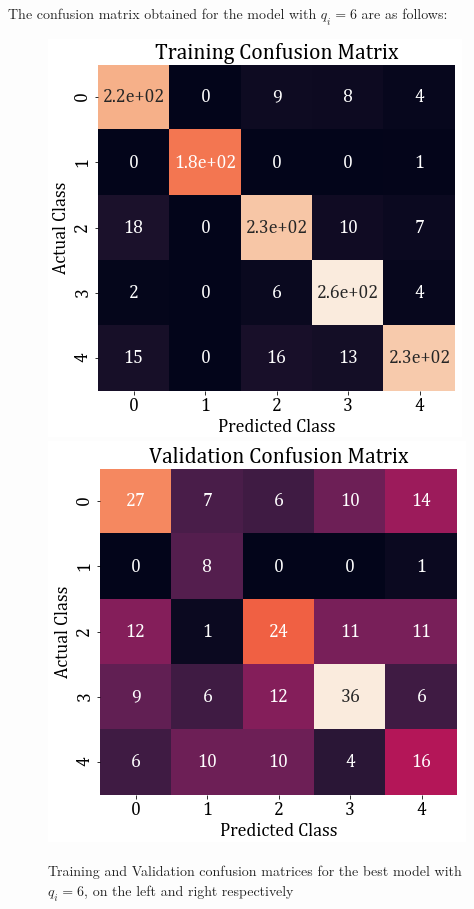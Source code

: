 \documentclass[11pt,a4paper]{article}
\newcommand{\noi}{\noindent}
\begin{document}
\noi
The confusion matrix obtained for the model with $q_i=6$ are as follows:
\begin{figure}[H]
    \centering
    \includegraphics[scale=0.5]{images/2a_full_train_conf.png}
    \includegraphics[scale=0.5]{images/2a_full_val_conf.png}
    \caption{Training and Validation confusion matrices for the best model with $q_i=6$, on the left and right respectively}
\end{figure}
\end{document}
